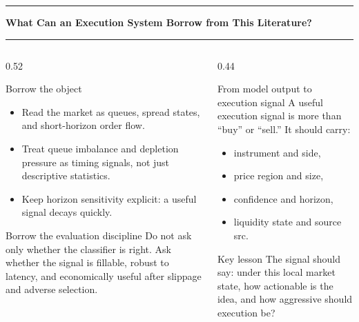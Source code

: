 \documentclass[aspectratio=169,10pt]{beamer}
\newcommand{\tightitems}{\setlength{\itemsep}{0.35em}}
\newcommand{\contentheader}[1]{%
  \vspace*{0.05em}%
  {\noindent\color{BrandOrange}\rule{0.42em}{0.42em}\hspace{0.50em}\bfseries\Large #1\par}%
  \vspace{0.15em}%
  {\color{BrandOrange}\rule{\textwidth}{1.4pt}\par}%
  \vspace{0.42em}%
}
\begin{document}
\begin{frame}[plain]
\contentheader{What Can an Execution System Borrow from This Literature?}
\begin{columns}[T,totalwidth=\textwidth]
\begin{column}{0.52\textwidth}
\begin{block}{Borrow the object}
\begin{itemize}\tightitems
  \item Read the market as queues, spread states, and short-horizon order flow.
  \item Treat queue imbalance and depletion pressure as timing signals, not just descriptive statistics.
  \item Keep horizon sensitivity explicit: a useful signal decays quickly.
\end{itemize}
\end{block}
\begin{block}{Borrow the evaluation discipline}
Do not ask only whether the classifier is right. Ask whether the signal is fillable, robust to latency, and economically useful after slippage and adverse selection.
\end{block}
\end{column}
\begin{column}{0.44\textwidth}
\begin{block}{From model output to execution signal}
A useful execution signal is more than ``buy'' or ``sell.'' It should carry:
\begin{itemize}\tightitems
  \item instrument and side,
  \item price region and size,
  \item confidence and horizon,
  \item liquidity state and source \textsf{src}.
\end{itemize}
\end{block}
\begin{block}{Key lesson}
The signal should say: under this local market state, how actionable is the idea, and how aggressive should execution be?
\end{block}
\end{column}
\end{columns}
\end{frame}
\end{document}
